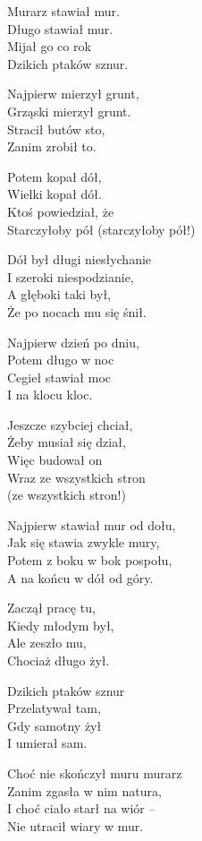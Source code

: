 \begin{text}
    Murarz stawiał mur.\\
    Długo stawiał mur.\\
    Mijał go co rok\\
    Dzikich ptaków sznur.

    Najpierw mierzył grunt,\\
    Grząski mierzył grunt.\\
    Stracił butów sto,\\
    Zanim zrobił to.

    Potem kopał dół,\\
    Wielki kopał dół.\\
    Ktoś powiedział, że\\
    Starczyłoby pół (starczyłoby pół!)

    Dół był długi niesłychanie\\
    I szeroki niespodzianie,\\
    A głęboki taki był,\\
    Że po nocach mu się śnił.

    Najpierw dzień po dniu,\\
    Potem długo w noc\\
    Cegieł stawiał moc\\
    I na klocu kloc.

    Jeszcze szybciej chciał,\\
    Żeby musiał się dział,\\
    Więc budował on\\
    Wraz ze wszystkich stron\\
    (ze wszystkich stron!)

    Najpierw stawiał mur od dołu,\\
    Jak się stawia zwykle mury,\\
    Potem z boku w bok pospołu,\\
    A na końcu w dół od góry.

    Zaczął pracę tu,\\
    Kiedy młodym był,\\
    Ale zeszło mu,\\
    Chociaż długo żył.

    Dzikich ptaków sznur\\
    Przelatywał tam,\\
    Gdy samotny żył\\
    I umierał sam.

    Choć nie skończył muru murarz\\
    Zanim zgasła w nim natura,\\
    I choć ciało starł na wiór –\\
    Nie utracił wiary w mur.
\end{text}
\begin{chord}

\end{chord}